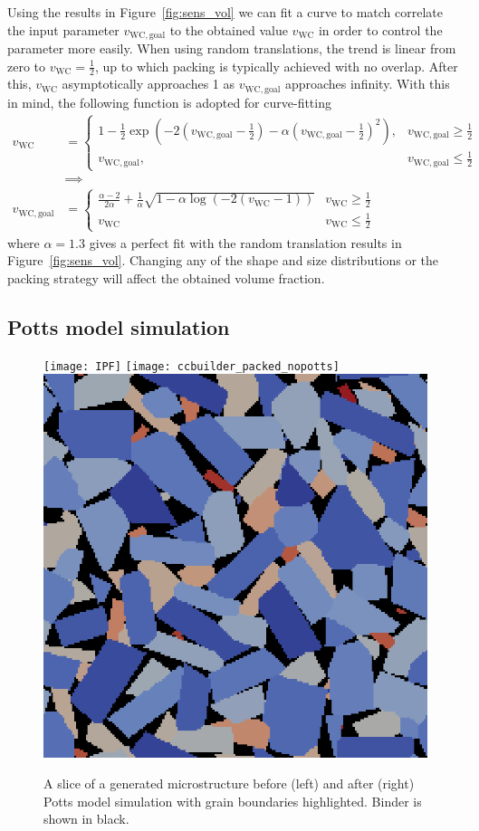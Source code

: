 \documentclass[3p,12pt]{elsarticle}
\newcommand{\WC}{\mathrm{WC}}
\begin{document}
Using the results in Figure~\ref{fig:sens_vol} we can fit a curve to match correlate the input parameter $v_{\WC,\text{goal}}$ to the obtained value $v_\WC$ in order to control the parameter more easily.
When using random translations, the trend is linear from zero to $v_\WC = \frac12$, up to which packing is typically achieved with no overlap.
After this, $v_\WC$ asymptotically approaches 1 as $v_{\WC,\text{goal}}$ approaches infinity.
With this in mind, the following function is adopted for curve-fitting
\begin{align}
 v_\WC &= \begin{cases}
  1 - \frac12\exp(- 2(v_{\WC,\text{goal}} -\frac12) - \alpha(v_{\WC,\text{goal}} -\frac12)^2 ), & v_{\WC,\text{goal}} \geq \frac12
  \\
  v_{\WC,\text{goal}}, & v_{\WC,\text{goal}} \leq \frac12
 \end{cases}
 \label{eq:v_wc}
 \\ 
 &\implies\nonumber
 \\
 v_{\WC,\text{goal}} &= \begin{cases}
    \frac{\alpha - 2}{2\alpha} + \frac1\alpha \sqrt{1 - \alpha\log(-2(v_\WC-1))} & v_\WC \geq \frac12
    \\
    v_\WC & v_\WC \leq \frac12
                       \end{cases}
                       \label{eq:inverse_v_wc}
\end{align}
where $\alpha = 1.3$ gives a perfect fit with the random translation results in Figure~\ref{fig:sens_vol}.
Changing any of the shape and size distributions or the packing strategy will affect the obtained volume fraction. 


\subsection{Potts model simulation}

\begin{figure}[H]
  \centering
  \texttt{[image: IPF]}
  \texttt{[image: ccbuilder\_packed\_nopotts]}
  \includegraphics[width=.3\linewidth]{ccbuilder_packed_cs}
  \caption{\label{fig:potts_before_after} A slice of a generated microstructure before (left) and after (right) Potts model simulation with grain boundaries highlighted. Binder is shown in black.}
\end{figure}
\end{document}
